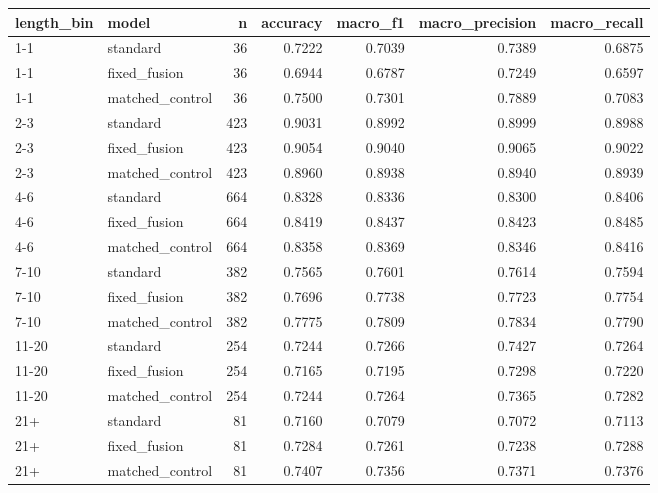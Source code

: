 \begin{tabular}{llrrrrr}
\toprule
length\_bin & model & n & accuracy & macro\_f1 & macro\_precision & macro\_recall \\
\midrule
1-1 & standard & 36 & 0.7222 & 0.7039 & 0.7389 & 0.6875 \\
1-1 & fixed\_fusion & 36 & 0.6944 & 0.6787 & 0.7249 & 0.6597 \\
1-1 & matched\_control & 36 & 0.7500 & 0.7301 & 0.7889 & 0.7083 \\
2-3 & standard & 423 & 0.9031 & 0.8992 & 0.8999 & 0.8988 \\
2-3 & fixed\_fusion & 423 & 0.9054 & 0.9040 & 0.9065 & 0.9022 \\
2-3 & matched\_control & 423 & 0.8960 & 0.8938 & 0.8940 & 0.8939 \\
4-6 & standard & 664 & 0.8328 & 0.8336 & 0.8300 & 0.8406 \\
4-6 & fixed\_fusion & 664 & 0.8419 & 0.8437 & 0.8423 & 0.8485 \\
4-6 & matched\_control & 664 & 0.8358 & 0.8369 & 0.8346 & 0.8416 \\
7-10 & standard & 382 & 0.7565 & 0.7601 & 0.7614 & 0.7594 \\
7-10 & fixed\_fusion & 382 & 0.7696 & 0.7738 & 0.7723 & 0.7754 \\
7-10 & matched\_control & 382 & 0.7775 & 0.7809 & 0.7834 & 0.7790 \\
11-20 & standard & 254 & 0.7244 & 0.7266 & 0.7427 & 0.7264 \\
11-20 & fixed\_fusion & 254 & 0.7165 & 0.7195 & 0.7298 & 0.7220 \\
11-20 & matched\_control & 254 & 0.7244 & 0.7264 & 0.7365 & 0.7282 \\
21+ & standard & 81 & 0.7160 & 0.7079 & 0.7072 & 0.7113 \\
21+ & fixed\_fusion & 81 & 0.7284 & 0.7261 & 0.7238 & 0.7288 \\
21+ & matched\_control & 81 & 0.7407 & 0.7356 & 0.7371 & 0.7376 \\
\bottomrule
\end{tabular}
